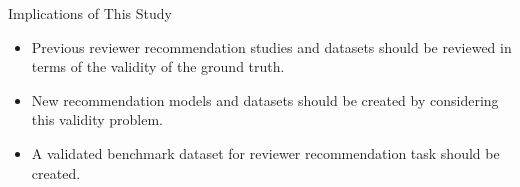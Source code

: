 \documentclass{beamer}
\begin{document}
\begin{frame}{Implications of This Study}
\begin{itemize}
    \item\large Previous reviewer recommendation studies and datasets should be reviewed in terms of the validity of the ground truth.
    \pause
    \item\large New recommendation models and datasets should be created by considering this validity problem.
    \pause
    \item\large A validated benchmark dataset for reviewer recommendation task should be created.  
\end{itemize}

\end{frame}

\end{document}

